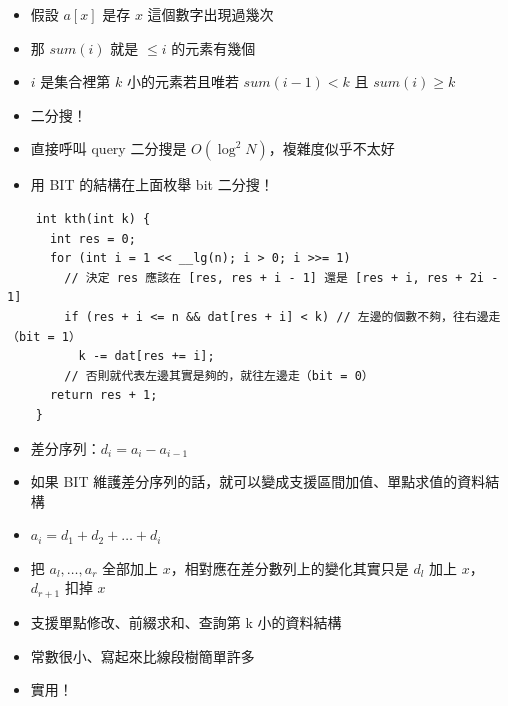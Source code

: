 \documentclass[standalone]{beamer}
\begin{document}
\begin{frame}{}
  \begin{itemize}
    \item 假設 $a[x]$ 是存 $x$ 這個數字出現過幾次
    \item 那 $sum(i)$ 就是 $\le i$ 的元素有幾個
    \item $i$ 是集合裡第 $k$ 小的元素若且唯若 $sum(i - 1) < k$ 且 $sum(i) \ge k$
    \item 二分搜！
    \item 直接呼叫 query 二分搜是 $O(\log^2 N)$，複雜度似乎不太好
    \item 用 BIT 的結構在上面枚舉 bit 二分搜！
  \end{itemize}
\end{frame}

\begin{frame}[fragile]{}
  \begin{verbatim}
    int kth(int k) {
      int res = 0;
      for (int i = 1 << __lg(n); i > 0; i >>= 1)
        // 決定 res 應該在 [res, res + i - 1] 還是 [res + i, res + 2i - 1]
        if (res + i <= n && dat[res + i] < k) // 左邊的個數不夠，往右邊走（bit = 1）
          k -= dat[res += i];
        // 否則就代表左邊其實是夠的，就往左邊走（bit = 0）
      return res + 1;
    }
  \end{verbatim}
\end{frame}

\begin{frame}{}
  \begin{itemize}
    \item 差分序列：$d_i = a_i - a_{i - 1}$
    \item 如果 BIT 維護差分序列的話，就可以變成支援區間加值、單點求值的資料結構
    \item $a_i = d_1 + d_2 + \ldots + d_i$
    \item 把 $a_l, \ldots, a_r$ 全部加上 $x$，相對應在差分數列上的變化其實只是 $d_l$ 加上 $x$，$d_{r+1}$ 扣掉 $x$
  \end{itemize}
\end{frame}

\begin{frame}{}
  \begin{itemize}
    \item 支援單點修改、前綴求和、查詢第 k 小的資料結構
    \item 常數很小、寫起來比線段樹簡單許多
    \item 實用！
  \end{itemize}
\end{frame}
\end{document}
